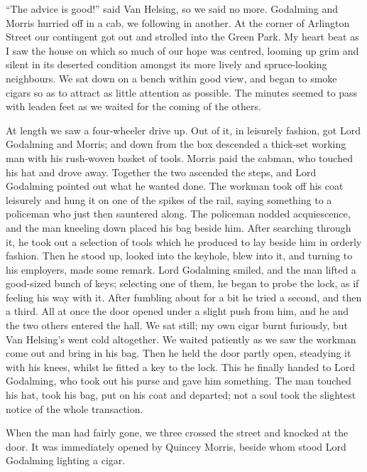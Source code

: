 \documentclass[12pt,openright]{book}
\begin{document}
“The advice is good!” said Van Helsing, so we said no more. Godalming and Morris hurried off in a cab, we following in another. At the corner of Arlington Street our contingent got out and strolled into the Green Park. My heart beat as I saw the house on which so much of our hope was centred, looming up grim and silent in its deserted condition amongst its more lively and spruce-looking neighbours. We sat down on a bench within good view, and began to smoke cigars so as to attract as little attention as possible. The minutes seemed to pass with leaden feet as we waited for the coming of the others.

At length we saw a four-wheeler drive up. Out of it, in leisurely fashion, got Lord Godalming and Morris; and down from the box descended a thick-set working man with his rush-woven basket of tools. Morris paid the cabman, who touched his hat and drove away. Together the two ascended the steps, and Lord Godalming pointed out what he wanted done. The workman took off his coat leisurely and hung it on one of the spikes of the rail, saying something to a policeman who just then sauntered along. The policeman nodded acquiescence, and the man kneeling down placed his bag beside him. After searching through it, he took out a selection of tools which he produced to lay beside him in orderly fashion. Then he stood up, looked into the keyhole, blew into it, and turning to his employers, made some remark. Lord Godalming smiled, and the man lifted a good-sized bunch of keys; selecting one of them, he began to probe the lock, as if feeling his way with it. After fumbling about for a bit he tried a second, and then a third. All at once the door opened under a slight push from him, and he and the two others entered the hall. We sat still; my own cigar burnt furiously, but Van Helsing’s went cold altogether. We waited patiently as we saw the workman come out and bring in his bag. Then he held the door partly open, steadying it with his knees, whilst he fitted a key to the lock. This he finally handed to Lord Godalming, who took out his purse and gave him something. The man touched his hat, took his bag, put on his coat and departed; not a soul took the slightest notice of the whole transaction.

When the man had fairly gone, we three crossed the street and knocked at the door. It was immediately opened by Quincey Morris, beside whom stood Lord Godalming lighting a cigar.
\end{document}
